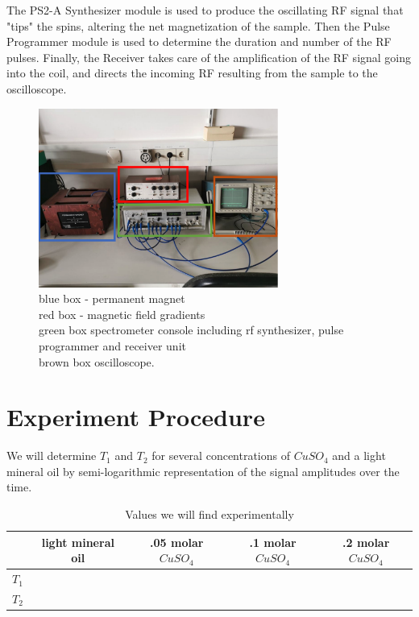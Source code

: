\documentclass[12pt]{article}
\begin{document}
The PS2-A Synthesizer module is used to produce the oscillating RF signal that "tips" the spins, altering the net magnetization of the sample. Then the Pulse Programmer module is used to determine the duration and number of the RF pulses. Finally, the Receiver takes care of the amplification of the RF signal going into the coil, and directs the incoming RF resulting from the sample to the oscilloscope.
\begin{figure}[h!]
  \centering
  \includegraphics[width=0.7\textwidth]{exp_setup.png}
  \caption{
  blue box - permanent magnet \\
  red box - magnetic field gradients \\
  green box spectrometer console including rf synthesizer, pulse programmer and receiver unit \\ brown box oscilloscope.\cite{experimental_setup_manual}}
  \label{fig:example}
\end{figure}

\section{Experiment Procedure}

We will determine $T_1$ and $T_2$ for several concentrations of $CuSO_4$ and a light mineral oil by semi-logarithmic representation of the signal amplitudes over the time.

\begin{table}[h!]
\centering
\begin{tabular}{|c|c|c|c|c|}
\hline
 & \textbf{light mineral oil} & \textbf{.05 molar $CuSO_4$} & \textbf{.1 molar $CuSO_4$} & \textbf{.2 molar $CuSO_4$} \\ \hline
$T_1$ &&  &  & \\ \hline
$T_2$ &&  &  & \\ \hline
\end{tabular}
\caption{Values we will find experimentally}
\label{tab:example_table}
\end{table}
\end{document}
